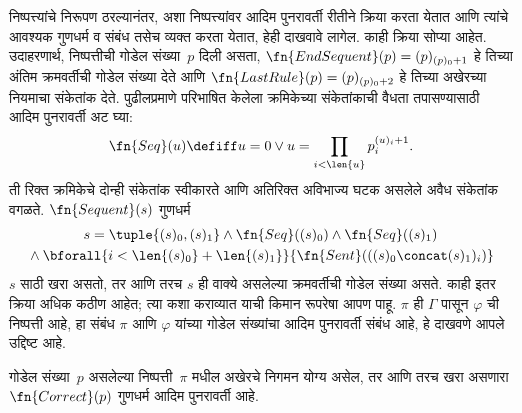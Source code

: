 \begin{explain}
निष्पत्त्यांचे निरूपण ठरल्यानंतर, अशा निष्पत्त्यांवर आदिम पुनरावर्ती रीतीने
क्रिया करता येतात आणि त्यांचे आवश्यक गुणधर्म व संबंध तसेच व्यक्त करता
येतात, हेही दाखवावे लागेल. काही क्रिया सोप्या आहेत. उदाहरणार्थ,
निष्पत्तीची गोडेल संख्या~$p$ दिली असता,
$\fn{EndSequent}(p) = (p)_{(p)_0+1}$ हे तिच्या अंतिम क्रमवर्तीची
गोडेल संख्या देते आणि $\fn{LastRule}(p) = (p)_{(p)_0+2}$ हे तिच्या
अखेरच्या नियमाचा संकेतांक देते. पुढीलप्रमाणे परिभाषित केलेला
क्रमिकेच्या संकेतांकाची वैधता तपासण्यासाठी आदिम पुनरावर्ती अट घ्या:
\[\fn{Seq}(u) \defiff u=0 \lor u=\prod_{i<\len{u}}p_i^{(u)_i+1}.
\]
ती रिक्त क्रमिकेचे दोन्ही संकेतांक स्वीकारते आणि अतिरिक्त अविभाज्य
घटक असलेले अवैध संकेतांक वगळते.
$\fn{Sequent}(s)$ गुणधर्म
\[  \begin{gathered}
  s=\tuple{(s)_0,(s)_1} \land \fn{Seq}((s)_0) \land \fn{Seq}((s)_1)\\
  {}\land \bforall{i<\len{(s)_0} + \len{(s)_1}}{\fn{Sent}(((s)_0 \concat (s)_1)_i)}
  \end{gathered}
\]
$s$ साठी खरा असतो, तर आणि तरच $s$ ही वाक्ये असलेल्या
क्रमवर्तीची गोडेल संख्या असते. काही इतर क्रिया अधिक कठीण आहेत; त्या कशा कराव्यात याची
किमान रूपरेषा आपण पाहू. $\pi$ ही $\Gamma$ पासून $\varphi$ ची
निष्पत्ती आहे, हा संबंध $\pi$ आणि $\varphi$ यांच्या गोडेल संख्यांचा
आदिम पुनरावर्ती संबंध आहे, हे दाखवणे आपले उद्दिष्ट आहे.
\end{explain}

\begin{prop}\label{inc:art:plk:prop:followsby}
  गोडेल संख्या~$p$ असलेल्या निष्पत्ती~$\pi$ मधील अखेरचे निगमन
  योग्य असेल, तर आणि तरच खरा असणारा $\fn{Correct}(p)$ गुणधर्म
  आदिम पुनरावर्ती आहे.
\end{prop}

